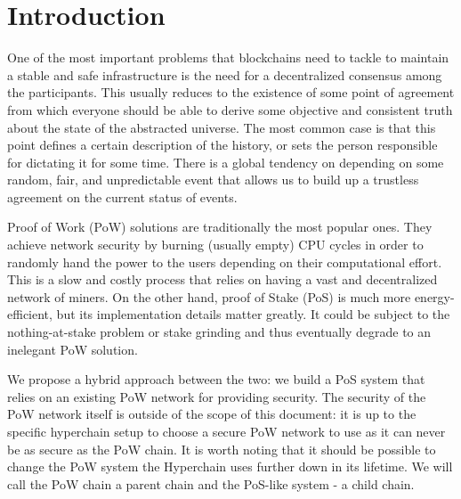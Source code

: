 \section{Introduction}

One of the most important problems that blockchains need to tackle to
maintain a stable and safe infrastructure is the need for a decentralized
consensus among the participants. This usually reduces to the existence of some
point of agreement from which everyone should be able to derive some objective
and consistent truth about the state of the abstracted universe. The most common
case is that this point defines a certain description of the history, or sets
the person responsible for dictating it for some time. There is a
global tendency on depending on some random, fair, and unpredictable event that
allows us to build up a trustless agreement on the current status of events.

Proof of Work (PoW) solutions are traditionally the most popular ones.
They achieve network security by burning (usually empty) CPU cycles in order to
randomly hand the power to the users depending on their computational effort.
This is a slow and costly process that relies on having
a vast and decentralized network of miners. On the other hand, proof of Stake (PoS)
is much more energy-efficient, but its implementation details matter
greatly. It could be subject to the nothing-at-stake problem or stake grinding and
thus eventually degrade to an inelegant PoW solution.

We propose a hybrid approach between the two: we build a PoS system that
relies on an existing PoW network for providing security. The security of the
PoW network itself is outside of the scope of this document: it is up to
the specific hyperchain setup to choose a secure PoW network to use as it
can never be as secure as the PoW chain. It is worth noting that it should
be possible to change the PoW system the Hyperchain uses further down
in its lifetime. We will call the PoW chain a parent chain and the PoS-like
system - a child chain.

